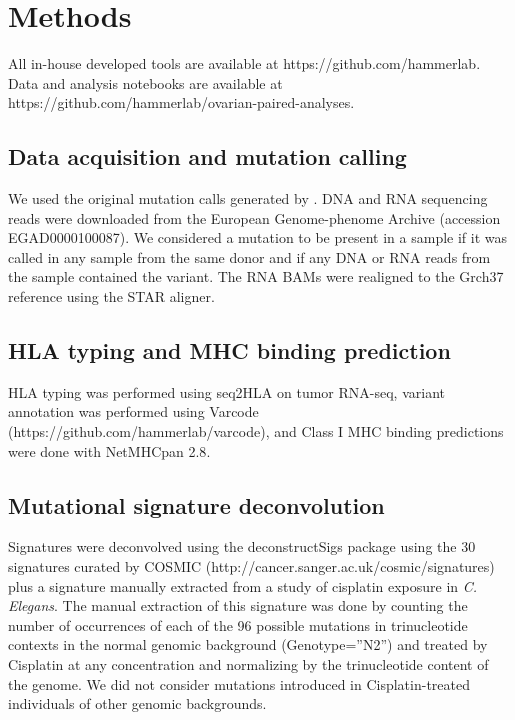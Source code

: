 \section*{Methods}
All in-house developed tools are available at https://github.com/hammerlab. Data and analysis notebooks are available at https://github.com/hammerlab/ovarian-paired-analyses.

\subsection*{Data acquisition and mutation calling}
We used the original mutation calls generated by \cite{Patch_2015}. DNA and RNA sequencing reads were downloaded from the European Genome-phenome Archive (accession EGAD0000100087). We considered a mutation to be present in a sample if it was called in any sample from the same donor and if any DNA or RNA reads from the sample contained the variant. The RNA BAMs were realigned to the Grch37 reference using the STAR aligner.

\subsection*{HLA typing and MHC binding prediction}
HLA typing was performed using seq2HLA\cite{Boegel_2012} on tumor RNA-seq, variant annotation was performed using Varcode (https://github.com/hammerlab/varcode), and Class I MHC binding predictions were done with NetMHCpan 2.8\cite{Lundegaard_2008}.

\subsection*{Mutational signature deconvolution}
Signatures were deconvolved using the deconstructSigs\cite{Rosenthal_2016} package using the 30 signatures curated by COSMIC (http://cancer.sanger.ac.uk/cosmic/signatures) plus a signature manually extracted from a study of cisplatin exposure in \textit{C. Elegans}\cite{Meier_2014}. The manual extraction of this signature was done by counting the number of occurrences of each of the 96 possible mutations in trinucleotide contexts in the normal genomic background (Genotype=”N2”) and treated by Cisplatin at any concentration and normalizing by the trinucleotide content of the  genome. We did not consider mutations introduced in Cisplatin-treated individuals of other genomic backgrounds.


